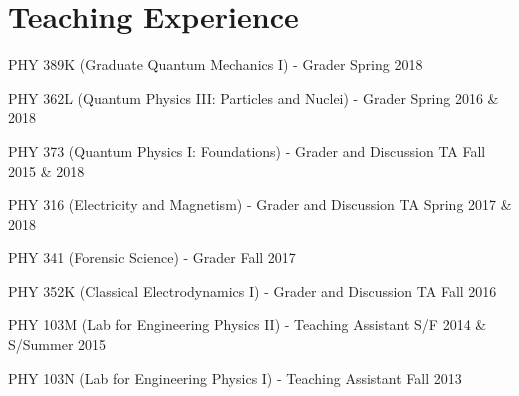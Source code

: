 \documentclass[letterpaper]{article}
\renewenvironment{itemize}{
  \begin{list}{}{
    \setlength{\leftmargin}{1.5em}
  }
}{
  \end{list}
}
\begin{document}
\section*{Teaching Experience}
\begin{itemize}

\item PHY 389K (Graduate Quantum Mechanics I) - Grader \hfill{Spring 2018}

\item PHY 362L (Quantum Physics III: Particles and Nuclei) - Grader \hfill{Spring 2016 \& 2018}

\item PHY 373 (Quantum Physics I: Foundations) - Grader and Discussion TA \hfill{Fall 2015 \& 2018}

\item PHY 316 (Electricity and Magnetism) - Grader and Discussion TA \hfill Spring 2017 \& 2018

\item PHY 341 (Forensic Science) - Grader \hfill Fall 2017

\item PHY 352K (Classical Electrodynamics I) - Grader and Discussion TA \hfill Fall 2016

\item PHY 103M (Lab for Engineering Physics II) - Teaching Assistant \hfill {S/F 2014 \& S/Summer 2015}

\item PHY 103N (Lab for Engineering Physics I) - Teaching Assistant \hfill {Fall 2013}

\end{itemize}
\end{document}
